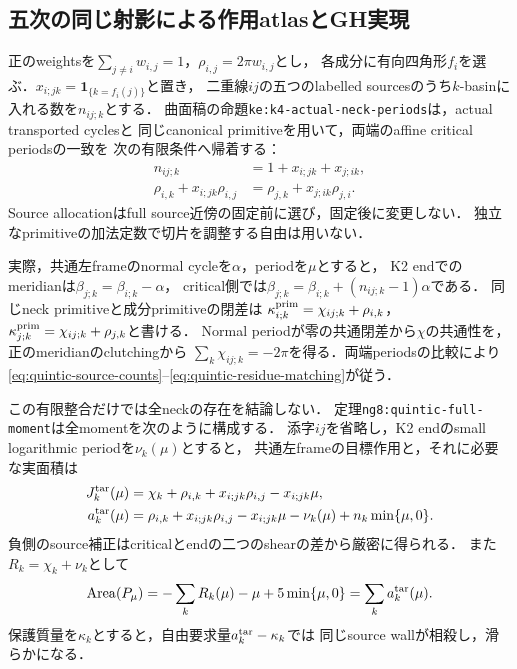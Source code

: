 \documentclass[a4paper,11pt]{ltjsarticle}
\numberwithin{equation}{section}
\theoremstyle{plain}
\theoremstyle{definition}
\theoremstyle{remark}
\begin{document}
\subsection{五次の同じ射影による作用atlasとGH実現}
\label{sec:quintic-simultaneous}

正のweightsを$\sum_{j\ne i}w_{i,j}=1$，$\rho_{i,j}=2\pi w_{i,j}$とし，
各成分に有向四角形$f_i$を選ぶ．$x_{i;jk}=\mathbf1_{\{k=f_i(j)\}}$と置き，
二重線$ij$の五つのlabelled sourcesのうち$k$-basinに入れる数を$n_{ij;k}$とする．
曲面稿の命題\texttt{ke:k4-actual-neck-periods}は，actual transported cyclesと
同じcanonical primitiveを用いて，両端のaffine critical periodsの一致を
次の有限条件へ帰着する：
\begin{align}
 n_{ij;k}&=1+x_{i;jk}+x_{j;ik},\label{eq:quintic-source-counts}\\
 \rho_{i,k}+x_{i;jk}\rho_{i,j}
   &=\rho_{j,k}+x_{j;ik}\rho_{j,i}.\label{eq:quintic-residue-matching}
\end{align}
Source allocationはfull source近傍の固定前に選び，固定後に変更しない．
独立なprimitiveの加法定数で切片を調整する自由は用いない．

実際，共通左frameのnormal cycleを$\alpha$，periodを$\mu$とすると，
K2 endでのmeridianは$\beta_{j;k}=\beta_{i;k}-\alpha$，
critical側では$\beta_{j;k}=\beta_{i;k}+(n_{ij;k}-1)\alpha$である．
同じneck primitiveと成分primitiveの閉差は
$\kappa^{\rm prim}_{i;k}=\chi_{ij;k}+\rho_{i,k}$，
$\kappa^{\rm prim}_{j;k}=\chi_{ij;k}+\rho_{j,k}$と書ける．
Normal periodが零の共通閉差から$\chi$の共通性を，正のmeridianのclutchingから
$\sum_k\chi_{ij;k}=-2\pi$を得る．両端periodsの比較により
\eqref{eq:quintic-source-counts}--\eqref{eq:quintic-residue-matching}が従う．

この有限整合だけでは全neckの存在を結論しない．
定理\texttt{ng8:quintic-full-moment}は全momentを次のように構成する．
添字$ij$を省略し，K2 endのsmall logarithmic periodを$\nu_k(\mu)$とすると，
共通左frameの目標作用と，それに必要な実面積は
\begin{align*}
 J_k^{\rm tar}(\mu)
   &=\chi_k+\rho_{i,k}+x_{i;jk}\rho_{i,j}-x_{i;jk}\mu,\\
 a_k^{\rm tar}(\mu)
   &=\rho_{i,k}+x_{i;jk}\rho_{i,j}-x_{i;jk}\mu-\nu_k(\mu)
      +n_k\min\{\mu,0\}.
\end{align*}
負側のsource補正はcriticalとendの二つのshearの差から厳密に得られる．
また$R_k=\chi_k+\nu_k$として
\[
 \operatorname{Area}(P_\mu)
 =-\sum_kR_k(\mu)-\mu+5\min\{\mu,0\}
 =\sum_ka_k^{\rm tar}(\mu).
\]
保護質量を$\kappa_k$とすると，自由要求量$a_k^{\rm tar}-\kappa_k$では
同じsource wallが相殺し，滑らかになる．
\end{document}
